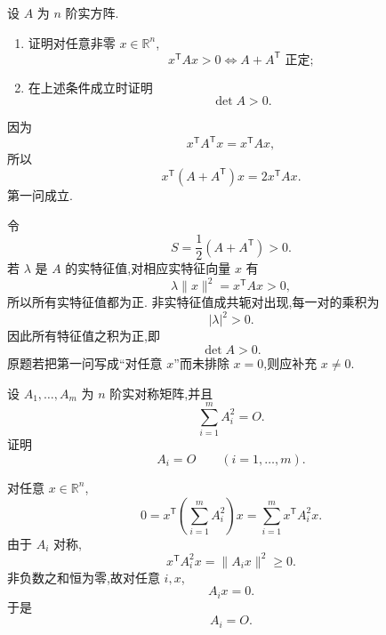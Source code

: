 \begin{example}[\markstar]
设 $A$ 为 $n$ 阶实方阵.
\begin{enumerate}
    \item 证明对任意非零 $x\in\mathbb{R}^n$,
    \[
    x^{\mathsf T}Ax>0
    \iff
    A+A^{\mathsf T}\text{ 正定};
    \]
    \item 在上述条件成立时证明
    \[
    \det A>0.
    \]
\end{enumerate}
\end{example}
\exampleblank

\begin{solution}
因为
\[
x^{\mathsf T}A^{\mathsf T}x
=
x^{\mathsf T}Ax,
\]
所以
\[
x^{\mathsf T}(A+A^{\mathsf T})x
=
2x^{\mathsf T}Ax.
\]
第一问成立.

令
\[
S=\dfrac12(A+A^{\mathsf T})>0.
\]
若 $\lambda$ 是 $A$ 的实特征值,对相应实特征向量 $x$ 有
\[
\lambda\|x\|^2=x^{\mathsf T}Ax>0,
\]
所以所有实特征值都为正.
非实特征值成共轭对出现,每一对的乘积为
\[
|\lambda|^2>0.
\]
因此所有特征值之积为正,即
\[
\boxed{\det A>0}.
\]
原题若把第一问写成``对任意 $x$''而未排除 $x=0$,则应补充 $x\neq0$.
\end{solution}


\begin{example}
设 $A_1,\ldots,A_m$ 为 $n$ 阶实对称矩阵,并且
\[
\displaystyle\sum\limits_{i=1}^{m}A_i^2=O.
\]
证明
\[
A_i=O
\qquad
(i=1,\ldots,m).
\]
\end{example}
\exampleblank

\begin{solution}
对任意 $x\in\mathbb{R}^n$,
\[
0
=
x^{\mathsf T}
\left(
\sum\limits_{i=1}^{m}A_i^2
\right)x
=
\sum\limits_{i=1}^{m}
x^{\mathsf T}A_i^2x.
\]
由于 $A_i$ 对称,
\[
x^{\mathsf T}A_i^2x
=
\|A_ix\|^2\ge0.
\]
非负数之和恒为零,故对任意 $i,x$,
\[
A_ix=0.
\]
于是
\[
\boxed{A_i=O}.
\]
\end{solution}
